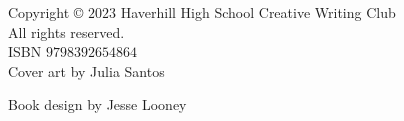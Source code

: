\vspace*{\fill}
\begin{center}
    Copyright \copyright{} $2023$ Haverhill High School Creative Writing Club\\
    All rights reserved.\\[\baselineskip]

    ISBN $9798392654864$\\[\baselineskip]
    
    Cover art by Julia Santos\par
    Book design by Jesse Looney\par
\end{center}
